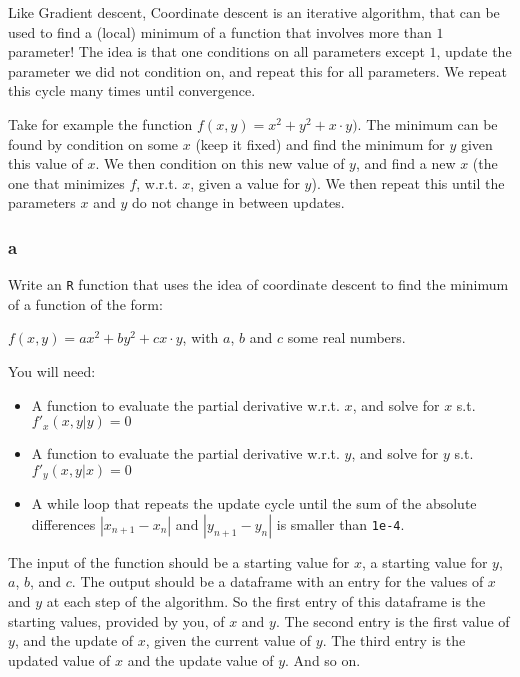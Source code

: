 \documentclass[]{article}
\providecommand{\tightlist}{%
  \setlength{\itemsep}{0pt}\setlength{\parskip}{0pt}}
\begin{document}
Like Gradient descent, Coordinate descent is an iterative algorithm,
that can be used to find a (local) minimum of a function that involves
more than \(1\) parameter! The idea is that one conditions on all
parameters except \(1\), update the parameter we did not condition on,
and repeat this for all parameters. We repeat this cycle many times
until convergence.

Take for example the function \(f(x, y) = x^2 + y^2 + x\cdot y)\). The
minimum can be found by condition on some \(x\) (keep it fixed) and find
the minimum for \(y\) given this value of \(x\). We then condition on
this new value of \(y\), and find a new \(x\) (the one that minimizes
\(f\), w.r.t. \(x\), given a value for \(y\)). We then repeat this until
the parameters \(x\) and \(y\) do not change in between updates.

\hypertarget{a-11}{%
\subsubsection{a}\label{a-11}}

Write an \texttt{R} function that uses the idea of coordinate descent to
find the minimum of a function of the form:

\(f(x, y) = ax^2 + by^2 + cx\cdot y\), with \(a\), \(b\) and \(c\) some
real numbers.

You will need:

\begin{itemize}
\tightlist
\item
  A function to evaluate the partial derivative w.r.t. \(x\), and solve
  for \(x\) s.t. \(f'_x(x, y | y) = 0\)
\item
  A function to evaluate the partial derivative w.r.t. \(y\), and solve
  for \(y\) s.t. \(f'_y(x, y | x) = 0\)
\item
  A while loop that repeats the update cycle until the sum of the
  absolute differences \(|x_{n+1} - x_{n}|\) and \(|y_{n+1} - y_{n}|\)
  is smaller than \texttt{1e-4}.
\end{itemize}

The input of the function should be a starting value for \(x\), a
starting value for \(y\), \(a\), \(b\), and \(c\). The output should be
a dataframe with an entry for the values of \(x\) and \(y\) at each step
of the algorithm. So the first entry of this dataframe is the starting
values, provided by you, of \(x\) and \(y\). The second entry is the
first value of \(y\), and the update of \(x\), given the current value
of \(y\). The third entry is the updated value of \(x\) and the update
value of \(y\). And so on.
\end{document}
